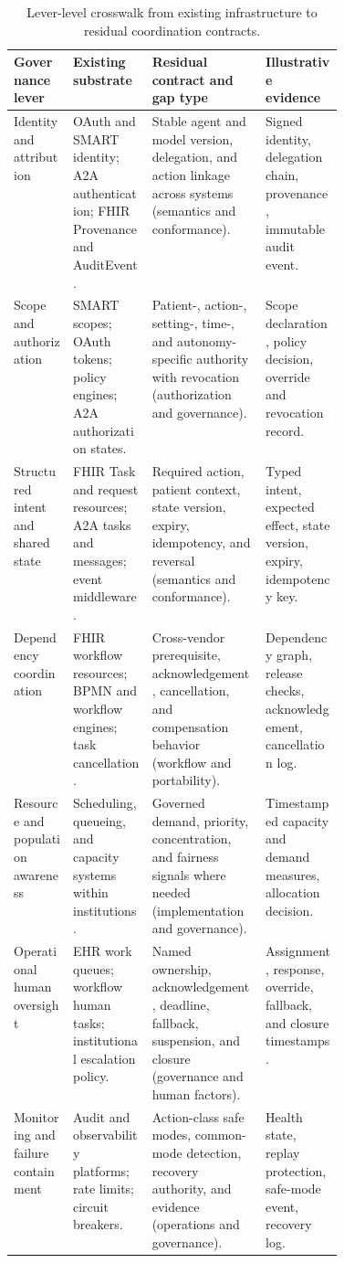 \documentclass[10pt]{article}
\begin{document}
\begin{table}[htbp]
\centering
\caption{Lever-level crosswalk from existing infrastructure to residual coordination contracts.}
\label{tab:levers}
\footnotesize
\begin{tabularx}{\linewidth}{B{0.18\linewidth}p{0.24\linewidth}YY}
\toprule
Governance lever & Existing substrate & Residual contract and gap type & Illustrative evidence \\
\midrule
Identity and attribution & OAuth and SMART identity; A2A authentication; FHIR Provenance and
AuditEvent. & Stable agent and model version, delegation, and action linkage across systems
(semantics and conformance). & Signed identity, delegation chain, provenance, immutable audit event. \\
Scope and authorization & SMART scopes; OAuth tokens; policy engines; A2A authorization states. &
Patient-, action-, setting-, time-, and autonomy-specific authority with revocation
(authorization and governance). & Scope declaration, policy decision, override and revocation record. \\
Structured intent and shared state & FHIR Task and request resources; A2A tasks and messages; event
middleware. & Required action, patient context, state version, expiry, idempotency, and reversal
(semantics and conformance). & Typed intent, expected effect, state version, expiry, idempotency key. \\
Dependency coordination & FHIR workflow resources; BPMN and workflow engines; task cancellation. &
Cross-vendor prerequisite, acknowledgement, cancellation, and compensation behavior
(workflow and portability). & Dependency graph, release checks, acknowledgement, cancellation log. \\
Resource and population awareness & Scheduling, queueing, and capacity systems within institutions. &
Governed demand, priority, concentration, and fairness signals where needed
(implementation and governance). & Timestamped capacity and demand measures, allocation decision. \\
Operational human oversight & EHR work queues; workflow human tasks; institutional escalation policy. &
Named ownership, acknowledgement, deadline, fallback, suspension, and closure
(governance and human factors). & Assignment, response, override, fallback, and closure timestamps. \\
Monitoring and failure containment & Audit and observability platforms; rate limits; circuit breakers. &
Action-class safe modes, common-mode detection, recovery authority, and evidence
(operations and governance). & Health state, replay protection, safe-mode event, recovery log. \\
\bottomrule
\end{tabularx}
\end{table}
\end{document}
